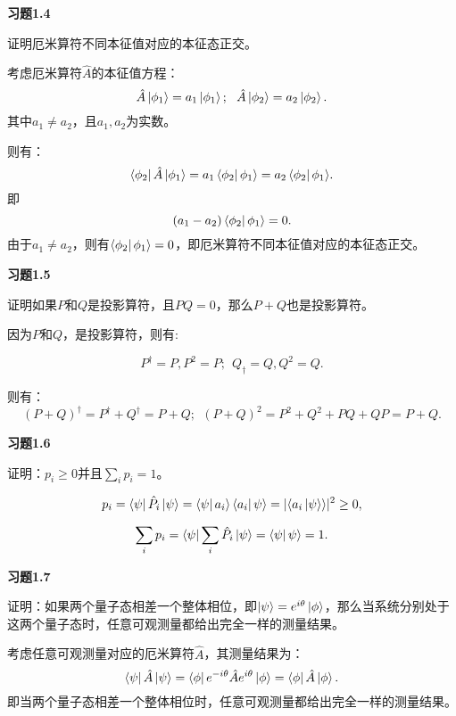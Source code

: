 \documentclass[reqno,a4paper,12pt]{amsart}
\begin{document}
\textbf{习题1.4}

证明厄米算符不同本征值对应的本征态正交。

\begin{tcolorbox}[breakable, colback = black!5!white, colframe = black]

考虑厄米算符$\hat{A}$的本征值方程：
\[
	\hat{A} \ket{\phi_1} = a_1 \ket{\phi_1}; ~~ \hat{A} \ket{\phi_2} = a_2 \ket{\phi_2}.
\]
其中$a_1\neq a_2$，且$a_1,a_2$为实数。

则有：
\[
	\bra{\phi_2} \hat{A} \ket{\phi_1} = a_1 \bra{\phi_2} \phi_1 \rangle = a_2 \bra{\phi_2} \phi_1 \rangle.
\]
即
\[
	(a_1 - a_2) \bra{\phi_2} \phi_1 \rangle = 0.
\]
由于$a_1 \neq a_2$，则有$\bra{\phi_2} \phi_1 \rangle = 0$，即厄米算符不同本征值对应的本征态正交。
\end{tcolorbox}

\textbf{习题1.5}

证明如果$P$和$Q$是投影算符，且$PQ=0$，那么$P+Q$也是投影算符。

\begin{tcolorbox}[breakable, colback = black!5!white, colframe = black]

因为$P$和$Q$，是投影算符，则有:

\[
	P^\dagger = P, P^2 = P; ~~ Q_\dagger = Q, Q^2 = Q.
\]

则有：
\[
	(P+Q)^\dagger = P^\dagger + Q^\dagger = P+Q; ~~ (P+Q)^2 = P^2 + Q^2 + PQ + QP = P + Q.
\]
{\color{blue}{其中应有$PQ = QP = 0$。}}
\end{tcolorbox}

\textbf{习题1.6}

证明：$p_i \geq 0$并且$\sum_i p_i = 1$。

\begin{tcolorbox}[breakable, colback = black!5!white, colframe = black]

\[
	p_i = \bra{\psi}\hat{P}_i\ket{\psi} = \bra{\psi} a_i \rangle \bra{a_i} \psi \rangle = \vert \langle a_i \ket{\psi} \rangle \vert^2 \geq 0,
\]

\[
	\sum_i p_i = \bra{\psi} \sum_i \hat{P}_i \ket{\psi} = \bra{\psi} \psi \rangle = 1.
\]
\end{tcolorbox}

\textbf{习题1.7}

证明：如果两个量子态相差一个整体相位，即$\ket{\psi} = e^{i\theta}\ket{\phi}$，那么当系统分别处于这两个量子态时，任意可观测量都给出完全一样的测量结果。

\begin{tcolorbox}[breakable, colback = black!5!white, colframe = black]

考虑任意可观测量对应的厄米算符$\hat{A}$，其测量结果为：
\[
	\bra{\psi} \hat{A} \ket{\psi} = \bra{\phi} e^{-i\theta} \hat{A} e^{i\theta} \ket{\phi} = \bra{\phi} \hat{A} \ket{\phi}.
\]
即当两个量子态相差一个整体相位时，任意可观测量都给出完全一样的测量结果。
\end{tcolorbox}
\end{document}
